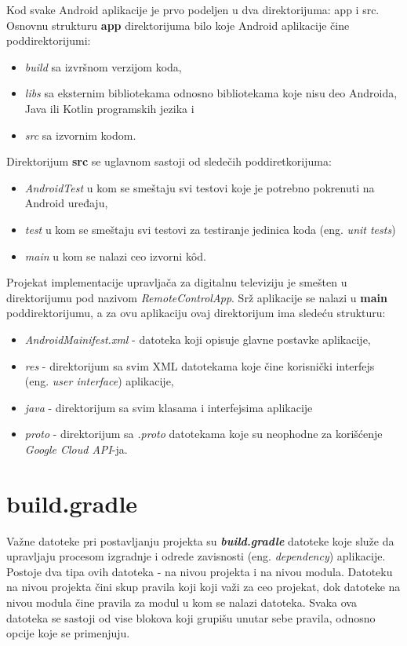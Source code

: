 \documentclass[implementacija.tex]{subfiles}
\begin{document}
Kod svake Android aplikacije je prvo podeljen u dva direktorijuma: app i src. Osnovnu strukturu \textbf{app} direktorijuma bilo koje Android aplikacije čine poddirektorijumi: 

\begin{itemize}
\item \textit{build} sa izvršnom verzijom koda,
\item \textit{libs} sa eksternim bibliotekama odnosno bibliotekama koje nisu deo Androida, Java ili Kotlin programskih jezika i
\item \textit{src} sa izvornim kodom.
\end{itemize}

 Direktorijum \textbf{src} se uglavnom sastoji od sledečih poddiretkorijuma: 
\begin{itemize}
\item \textit{AndroidTest} u kom se smeštaju svi testovi koje je potrebno pokrenuti na Android uređaju, 
\item \textit{test} u kom se smeštaju svi testovi za testiranje jedinica koda (eng. \textit{unit tests})
\item \textit{main} u kom se nalazi ceo izvorni k\^{o}d.
\end{itemize}

Projekat implementacije upravljača za digitalnu televiziju je smešten u direktorijumu pod nazivom \textit{RemoteControlApp}. Srž aplikacije se nalazi u \textbf{main} poddirektorijumu, a za ovu aplikaciju ovaj direktorijum ima sledeću strukturu:
\begin{itemize}
\item \textit{AndroidMainifest.xml} - datoteka koji opisuje glavne postavke aplikacije,
\item \textit{res} - direktorijum sa svim XML datotekama koje čine korisnički interfejs (eng. \textit{user interface}) aplikacije,
\item \textit{java} - direktorijum sa svim klasama i interfejsima aplikacije
\item \textit{proto} - direktorijum sa \textit{.proto} datotekama koje su neophodne za korišćenje \textit{Google Cloud API}-ja.
\end{itemize}

\section{build.gradle}
Važne datoteke pri postavljanju projekta su \textbf{\textit{build.gradle}} datoteke koje služe da  upravljaju procesom izgradnje i odrede zavisnosti (eng. \textit{dependency}) aplikacije. Postoje dva tipa ovih datoteka - na nivou projekta i na nivou modula. Datoteku na nivou projekta čini skup pravila koji koji važi za ceo projekat, dok datoteke na nivou modula čine pravila za modul u kom se nalazi datoteka. Svaka ova datoteka se sastoji od vise blokova koji grupišu unutar sebe pravila, odnosno opcije koje se primenjuju.
\end{document}
